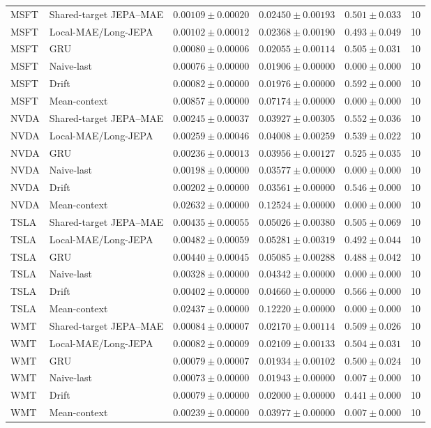 \begin{longtable}{llrrrr}
MSFT & Shared-target JEPA--MAE & $0.00109 \pm 0.00020$ & $0.02450 \pm 0.00193$ & $0.501 \pm 0.033$ & 10 \\
MSFT & Local-MAE/Long-JEPA & $0.00102 \pm 0.00012$ & $0.02368 \pm 0.00190$ & $0.493 \pm 0.049$ & 10 \\
MSFT & GRU & $0.00080 \pm 0.00006$ & $0.02055 \pm 0.00114$ & $0.505 \pm 0.031$ & 10 \\
MSFT & Naive-last & $0.00076 \pm 0.00000$ & $0.01906 \pm 0.00000$ & $0.000 \pm 0.000$ & 10 \\
MSFT & Drift & $0.00082 \pm 0.00000$ & $0.01976 \pm 0.00000$ & $0.592 \pm 0.000$ & 10 \\
MSFT & Mean-context & $0.00857 \pm 0.00000$ & $0.07174 \pm 0.00000$ & $0.000 \pm 0.000$ & 10 \\
NVDA & Shared-target JEPA--MAE & $0.00245 \pm 0.00037$ & $0.03927 \pm 0.00305$ & $0.552 \pm 0.036$ & 10 \\
NVDA & Local-MAE/Long-JEPA & $0.00259 \pm 0.00046$ & $0.04008 \pm 0.00259$ & $0.539 \pm 0.022$ & 10 \\
NVDA & GRU & $0.00236 \pm 0.00013$ & $0.03956 \pm 0.00127$ & $0.525 \pm 0.035$ & 10 \\
NVDA & Naive-last & $0.00198 \pm 0.00000$ & $0.03577 \pm 0.00000$ & $0.000 \pm 0.000$ & 10 \\
NVDA & Drift & $0.00202 \pm 0.00000$ & $0.03561 \pm 0.00000$ & $0.546 \pm 0.000$ & 10 \\
NVDA & Mean-context & $0.02632 \pm 0.00000$ & $0.12524 \pm 0.00000$ & $0.000 \pm 0.000$ & 10 \\
TSLA & Shared-target JEPA--MAE & $0.00435 \pm 0.00055$ & $0.05026 \pm 0.00380$ & $0.505 \pm 0.069$ & 10 \\
TSLA & Local-MAE/Long-JEPA & $0.00482 \pm 0.00059$ & $0.05281 \pm 0.00319$ & $0.492 \pm 0.044$ & 10 \\
TSLA & GRU & $0.00440 \pm 0.00045$ & $0.05085 \pm 0.00288$ & $0.488 \pm 0.042$ & 10 \\
TSLA & Naive-last & $0.00328 \pm 0.00000$ & $0.04342 \pm 0.00000$ & $0.000 \pm 0.000$ & 10 \\
TSLA & Drift & $0.00402 \pm 0.00000$ & $0.04660 \pm 0.00000$ & $0.566 \pm 0.000$ & 10 \\
TSLA & Mean-context & $0.02437 \pm 0.00000$ & $0.12220 \pm 0.00000$ & $0.000 \pm 0.000$ & 10 \\
WMT & Shared-target JEPA--MAE & $0.00084 \pm 0.00007$ & $0.02170 \pm 0.00114$ & $0.509 \pm 0.026$ & 10 \\
WMT & Local-MAE/Long-JEPA & $0.00082 \pm 0.00009$ & $0.02109 \pm 0.00133$ & $0.504 \pm 0.031$ & 10 \\
WMT & GRU & $0.00079 \pm 0.00007$ & $0.01934 \pm 0.00102$ & $0.500 \pm 0.024$ & 10 \\
WMT & Naive-last & $0.00073 \pm 0.00000$ & $0.01943 \pm 0.00000$ & $0.007 \pm 0.000$ & 10 \\
WMT & Drift & $0.00079 \pm 0.00000$ & $0.02000 \pm 0.00000$ & $0.441 \pm 0.000$ & 10 \\
WMT & Mean-context & $0.00239 \pm 0.00000$ & $0.03977 \pm 0.00000$ & $0.007 \pm 0.000$ & 10 \\
\bottomrule
\end{longtable}
